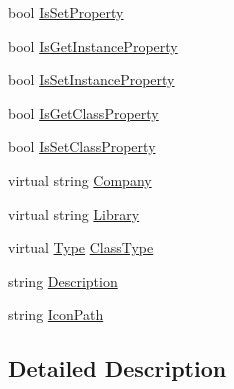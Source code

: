 \begin{DoxyCompactItemize}
\item 
bool \hyperlink{classi_c_s___member_info_ad8dfb5e00b9136415b5f0694bf6fe1f6}{Is\+Set\+Property}
\item 
bool \hyperlink{classi_c_s___member_info_a42b1a913e3d3ddc81116059e46acf9e4}{Is\+Get\+Instance\+Property}
\item 
bool \hyperlink{classi_c_s___member_info_ae398d9466f96b787907fd1a00f8b6e87}{Is\+Set\+Instance\+Property}
\item 
bool \hyperlink{classi_c_s___member_info_abb5da6031a0722604a805a30ed0df6f9}{Is\+Get\+Class\+Property}
\item 
bool \hyperlink{classi_c_s___member_info_a096efbf93c7f0ce821316e9f56f82588}{Is\+Set\+Class\+Property}
\item 
virtual string \hyperlink{classi_c_s___member_info_a546e455e47aa7c708b1d82cb34d1c5cd}{Company}
\item 
virtual string \hyperlink{classi_c_s___member_info_ae474ad6187f15a3af51291d0137f8f04}{Library}
\item 
virtual \hyperlink{i_c_s___object_type_enum_8cs_ae6c3dd6d8597380b56d94908eb431547aa1fa27779242b4902f7ae3bdd5c6d508}{Type} \hyperlink{classi_c_s___member_info_a42fc18c409fa6a2ba0ec245ffa039bbb}{Class\+Type}
\item 
string \hyperlink{classi_c_s___member_info_a979bd1197412783cc1e95f7e771c9f28}{Description}
\item 
string \hyperlink{classi_c_s___member_info_afcf3e1b120443ac0b1b2e9982197e8a3}{Icon\+Path}
\end{DoxyCompactItemize}


\subsection{Detailed Description}


